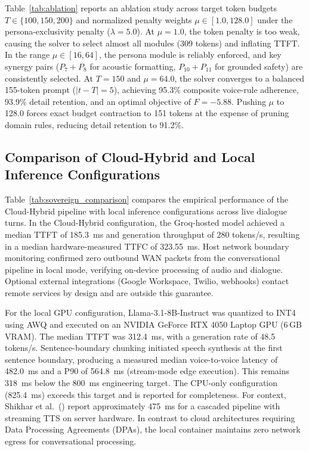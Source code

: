 \documentclass[review,12pt,times,authoryear]{elsarticle}
\theoremstyle{definition}
\begin{document}
Table~\ref{tab:ablation} reports an ablation study across target token budgets $T \in \{100, 150, 200\}$ and normalized penalty weights $\mu \in [1.0, 128.0]$ under the persona-exclusivity penalty ($\lambda = 5.0$). At $\mu = 1.0$, the token penalty is too weak, causing the solver to select almost all modules (309 tokens) and inflating TTFT. In the range $\mu \in [16, 64]$, the persona module is reliably enforced, and key synergy pairs ($P_7+P_8$ for acoustic formatting, $P_{10}+P_{11}$ for grounded safety) are consistently selected. At $T=150$ and $\mu=64.0$, the solver converges to a balanced 155-token prompt ($|t - T| = 5$), achieving 95.3\% composite voice-rule adherence, 93.9\% detail retention, and an optimal objective of $F = -5.88$. Pushing $\mu$ to 128.0 forces exact budget contraction to 151 tokens at the expense of pruning domain rules, reducing detail retention to 91.2\%.

\subsection{Comparison of Cloud-Hybrid and Local Inference Configurations}
\label{sec:sovereign_eval}
Table~\ref{tab:sovereign_comparison} compares the empirical performance of the Cloud-Hybrid pipeline with local inference configurations across live dialogue turns. In the Cloud-Hybrid configuration, the Groq-hosted model achieved a median TTFT of \SI{185.3}{\milli\second} and generation throughput of 280 tokens/s, resulting in a median hardware-measured TTFC of \SI{323.55}{\milli\second}. Host network boundary monitoring confirmed zero outbound WAN packets from the conversational pipeline in local mode, verifying on-device processing of audio and dialogue. Optional external integrations (Google Workspace, Twilio, webhooks) contact remote services by design and are outside this guarantee. 

For the local GPU configuration, Llama-3.1-8B-Instruct was quantized to INT4 using AWQ and executed on an NVIDIA GeForce RTX 4050 Laptop GPU (6\,GB VRAM). The median TTFT was \SI{312.4}{\milli\second}, with a generation rate of 48.5 tokens/s. Sentence-boundary chunking initiated speech synthesis at the first sentence boundary, producing a measured median voice-to-voice latency of \SI{482.0}{\milli\second} and a P90 of \SI{564.8}{\milli\second} (stream-mode edge execution). This remains \SI{318}{\milli\second} below the \SI{800}{\milli\second} engineering target. The CPU-only configuration (\SI{825.4}{\milli\second}) exceeds this target and is reported for completeness. For context, Shikhar et al.~(\citeyear{Shikhar2025}) report approximately \SI{475}{\milli\second} for a cascaded pipeline with streaming TTS on server hardware. In contrast to cloud architectures requiring Data Processing Agreements (DPAs), the local container maintains zero network egress for conversational processing.
\end{document}

